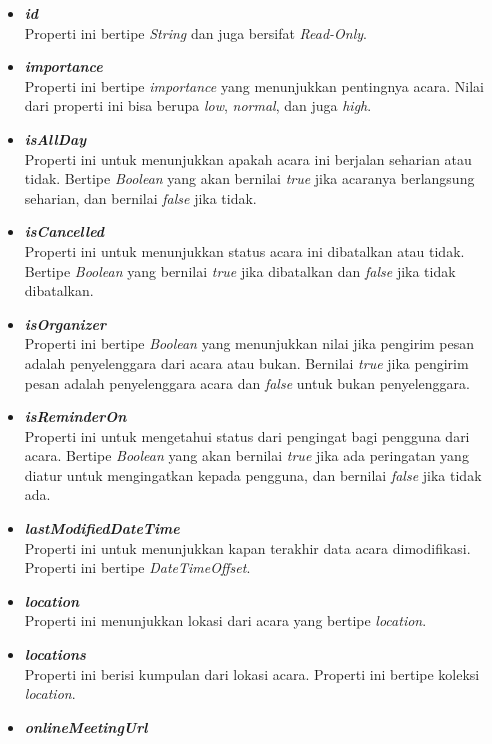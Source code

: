 \begin{itemize}
	\item \textbf{\textit{id}}\\
	Properti ini bertipe \textit{String} dan juga bersifat \textit{Read-Only}.
	\item \textbf{\textit{importance}}\\
	Properti ini bertipe \textit{importance} yang menunjukkan pentingnya acara. Nilai dari properti ini bisa berupa \textit{low}, \textit{normal}, dan juga \textit{high}. 
	\item \textbf{\textit{isAllDay}}\\
	Properti ini untuk menunjukkan apakah acara ini berjalan seharian atau tidak. Bertipe \textit{Boolean} yang akan bernilai \textit{true} jika acaranya berlangsung seharian, dan bernilai \textit{false} jika tidak. 
	\item \textbf{\textit{isCancelled}}\\
	Properti ini untuk menunjukkan status acara ini dibatalkan atau tidak. Bertipe \textit{Boolean} yang bernilai \textit{true} jika dibatalkan dan \textit{false} jika tidak dibatalkan. 
	\item \textbf{\textit{isOrganizer}}\\
	Properti ini bertipe \textit{Boolean} yang menunjukkan nilai jika pengirim pesan adalah penyelenggara dari acara atau bukan. Bernilai \textit{true} jika pengirim pesan adalah penyelenggara acara dan \textit{false} untuk bukan penyelenggara. 
	\item \textbf{\textit{isReminderOn}}\\
	Properti ini untuk mengetahui status dari pengingat bagi pengguna dari acara. Bertipe \textit{Boolean} yang akan bernilai \textit{true} jika ada peringatan yang diatur untuk mengingatkan kepada pengguna, dan bernilai \textit{false} jika tidak ada. 
	\item \textbf{\textit{lastModifiedDateTime}}\\
	Properti ini untuk menunjukkan kapan terakhir data acara dimodifikasi. Properti ini bertipe \textit{DateTimeOffset}. 
	\item \textbf{\textit{location}}\\
	Properti ini menunjukkan lokasi dari acara yang bertipe \textit{location}. 
	\item \textbf{\textit{locations}}\\
	Properti ini berisi kumpulan dari lokasi acara. Properti ini bertipe koleksi \textit{location}.
	\item \textbf{\textit{onlineMeetingUrl}}\\

\end{itemize}
